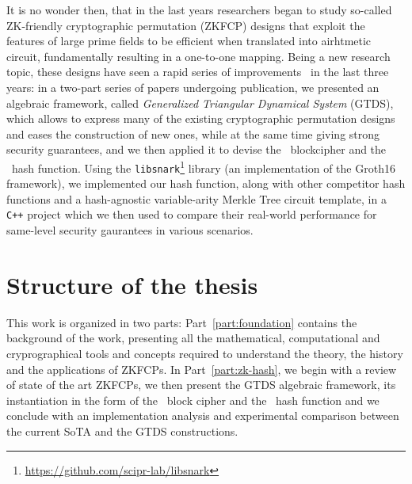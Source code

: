 It is no wonder then, that in the last years researchers began to study so-called ZK-friendly 
cryptographic permutation (ZKFCP) designs that exploit the features of large prime fields to be 
efficient when translated into airhtmetic circuit, fundamentally resulting in a one-to-one mapping.
Being a new research topic, these designs have seen a rapid series of 
improvements~\cite{AlbrechtGRRT2016,GrassiKRRS2021,GrassiHRSWW2022} in the last three years:
in a two-part series of papers undergoing publication, we presented an algebraic 
framework, called \emph{Generalized Triangular Dynamical System} (GTDS), which allows to express
many of the existing cryptographic permutation designs and eases the construction of new ones, while
at the same time giving strong security guarantees, and we then applied it to devise the \Blocc\ 
blockcipher and the \Stamp\ hash function.
Using the \texttt{libsnark}\footnote{\url{https://github.com/scipr-lab/libsnark}} library (an 
implementation of the Groth16 framework), we implemented our hash function, along with other 
competitor hash functions and a hash-agnostic variable-arity Merkle Tree circuit template, in a 
\texttt{C++} project which we then used to compare their real-world performance for same-level 
security gaurantees in various scenarios.

\section*{Structure of the thesis}
This work is organized in two parts: Part~\ref{part:foundation} contains the background of 
the work, presenting all the mathematical, computational and cryprographical tools and concepts 
required to understand the theory, the history and the applications of ZKFCPs.
In Part~\ref{part:zk-hash}, we begin with a review of state of the art ZKFCPs,
we then present the GTDS algebraic framework, its instantiation in the form of the \Blocc\ block 
cipher and the \Stamp\ hash function and we conclude with an implementation analysis and 
experimental comparison between the current SoTA and the GTDS constructions. 

